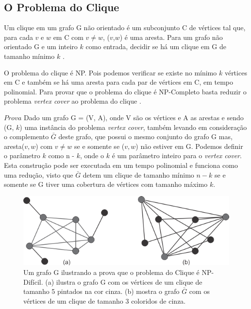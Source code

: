 \subsection{O Problema do Clique}

Um clique em um grafo G não orientado é um subconjunto C de vértices tal que, para cada $v$ e $w$ em C com $v \neq w$, ($v$,$w$) é uma aresta.
Para um grafo não orientado G e um inteiro $k$ como entrada, decidir se há um clique em G de tamanho mínimo $k$ \cite{goodrichprojeto}.

O problema do clique é NP. Pois podemos verificar se existe no mínimo $k$ vértices em C e também se há uma aresta para cada par de vértices em C, em tempo polinomial. Para provar que o problema do clique é NP-Completo basta reduzir o problema \textit{vertex cover} ao problema do clique \cite{HOPCROFT1974}.

$Prova$ Dado um grafo G = (V, A), onde V são os vértices e A as arestas e sendo (G, $k$) uma instância do problema \textit{vertex cover}, também levando em consideração o complemento $\bar{G}$ deste grafo, que possui o mesmo conjunto do grafo G mas, aresta($v,w$) com $v \neq w$ se e somente se ($v,w$) não estiver em G. Podemos definir o parâmetro $k$ como n - $k$, onde o $k$ é um parâmetro inteiro para o \textit{vertex cover}. Esta construção pode ser executada em um tempo polinomial e funciona como uma redução, visto que $\bar{G}$ detem um clique de tamanho mínimo $n-k$ se e somente se G tiver uma cobertura de vértices com tamanho máximo $k$.\cite{goodrichprojeto}

\begin{figure}[H]
	\centering
	\label{fig1}
	\includegraphics[scale=2]{./figuras/figClique.png}
	\caption{Um grafo G ilustrando a prova que o problema do Clique é NP-Difícil. (a) ilustra o grafo G com os vértices de um clique de tamanho 5 pintados na cor cinza. (b) mostra o grafo $\bar{G}$ com os vértices de um clique de tamanho 3 coloridos de cinza. \cite{goodrichprojeto}}
\end{figure}
